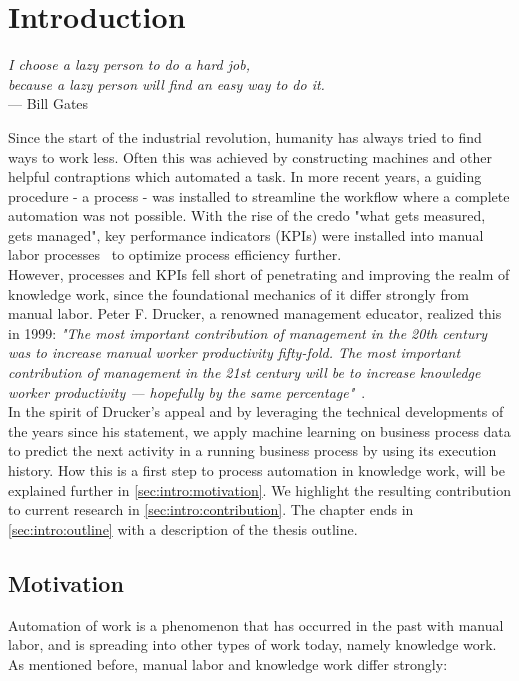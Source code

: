 \chapter{Introduction}\label{sec:intro}
\begin{flushright}{\slshape
I choose a lazy person to do a hard job,\\
because a lazy person will find an easy way to do it.}\\
\medskip
--- Bill Gates
\end{flushright}

\noindent Since the start of the industrial revolution, humanity has always tried to find ways to work less. Often this was achieved by constructing machines and other helpful contraptions which automated a task. In more recent years, a guiding procedure - a process - was installed to streamline the workflow where a complete automation was not possible. With the rise of the credo "what gets measured, gets managed", key performance indicators (KPIs) were installed into manual labor processes~\cite{web:taylorism-and-drucker} to optimize process efficiency further.\\

However, processes and KPIs fell short of penetrating and improving the realm of knowledge work, since the foundational mechanics of it differ strongly from manual labor. Peter F. Drucker, a renowned management educator, realized this in 1999:
{\slshape"The most important contribution of management in the 20th century was to increase manual worker productivity fifty-fold. The most important contribution of management in the 21st century will be to increase knowledge worker productivity — hopefully by the same percentage"}~\cite{drucker1999}.\\

In the spirit of Drucker's appeal and by leveraging the technical developments of the years since his statement, we apply machine learning on business process data to predict the next activity in a running business process by using its execution history. How this is a first step to process automation in knowledge work, will be explained further in \autoref{sec:intro:motivation}.  We highlight the resulting contribution to current research in \autoref{sec:intro:contribution}. The chapter ends in \autoref{sec:intro:outline} with a description of the thesis outline.

\section{Motivation} \label{sec:intro:motivation}
Automation of work is a phenomenon that has occurred in the past with manual labor, and is spreading into other types of work today, namely knowledge work. As mentioned before, manual labor and knowledge work differ strongly:

